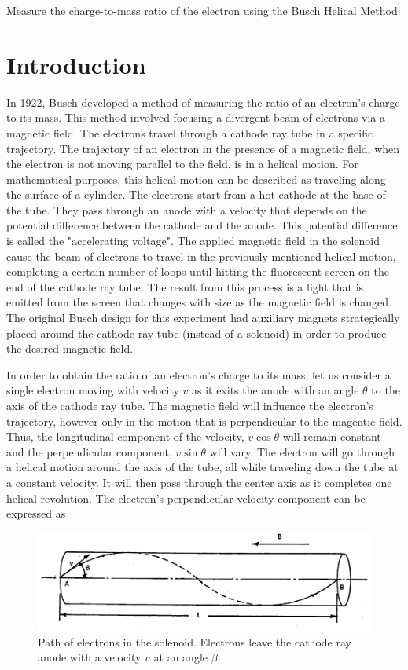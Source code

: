 \documentclass[%
 aip,
 amsmath,amssymb,
 reprint,%
floatfix,
]{revtex4-1}
\begin{document}
	Measure the charge-to-mass ratio of the electron using the Busch Helical Method.

\section{\label{sec:level2}Introduction}

In 1922, Busch developed a method of measuring the ratio of an electron's charge to its mass. This method involved focusing a divergent beam of electrons via a magnetic field. The electrons travel through a cathode ray tube in a specific trajectory. The trajectory of an electron in the presence of a magnetic field, when the electron is not moving parallel to the field, is in a helical motion. For mathematical purposes, this helical motion can be described as traveling along the surface of a cylinder. The electrons start from a hot cathode at the base of the tube. They pass through an anode with a velocity that depends on the potential difference between the cathode and the anode. This potential difference is called the "accelerating voltage". The applied magnetic field in the solenoid cause the beam of electrons to travel in the previously mentioned helical motion, completing a certain number of loops until hitting the fluorescent screen on the end of the cathode ray tube. The result from this process is a light that is emitted from the screen that changes with size as the magnetic field is changed. The original Busch design for this experiment had auxiliary magnets strategically placed around the cathode ray tube (instead of a solenoid) in order to produce the desired magnetic field\cite{Stranathan1942}.

In order to obtain the ratio of an electron's charge to its mass, let us consider a single electron moving with velocity $v$ as it exits the anode with an angle $\theta$ to the axis of the cathode ray tube. The magnetic field will influence the electron's trajectory, however only in the motion that is perpendicular to the magentic field. Thus, the longitudinal component of the velocity, $v \cos{\theta}$ will remain constant and the perpendicular component, $v \sin{\theta}$ will vary. The electron will go through a helical motion around the axis of the tube, all while traveling down the tube at a constant velocity. It will then pass through the center axis as it completes one helical revolution. The electron's perpendicular velocity component can be expressed as

\begin{figure}[H]
		\centering
		\includegraphics[scale=0.5]{electrontrajectory.png}
		\caption{Path of electrons in the solenoid. Electrons leave the cathode ray anode with a velocity $v$ at an angle $\beta$.}
	\end{figure}
\end{document}
